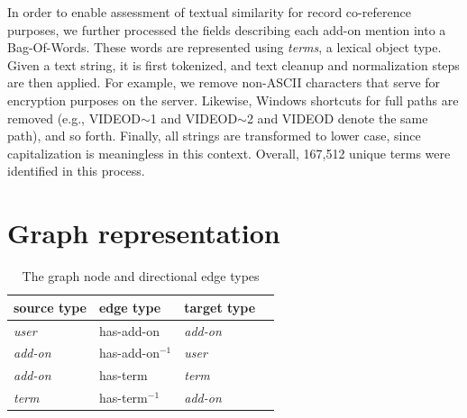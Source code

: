 \documentclass[11pt,oneside]{book}
\let\Oldsection\section
\renewcommand{\section}{\FloatBarrier\Oldsection}
\begin{document}
In order to enable assessment of textual similarity for record co-reference purposes, we further processed the fields describing each add-on mention into a Bag-Of-Words. These words are represented using {\it terms}, a lexical object type. Given a text string, it is first tokenized, and text cleanup and normalization steps are then applied. For example, we remove non-ASCII characters that serve for encryption purposes on the server. Likewise,  Windows shortcuts for full paths are removed (e.g., VIDEOD$\sim$1 and VIDEOD$\sim$2 and VIDEOD denote the same path), and so forth. Finally, all strings are transformed to lower case, since capitalization is meaningless in this context. Overall, 167,512 unique terms were identified in this process.


\section{Graph representation}
\label{sec:graph_representation}
\begin{table}[t]
\begin{center}
\begin{small}
\begin{tabular}{llll}
\hline 
\textbf{source type} & \textbf{edge type} & \textbf{target type} \\
\hline
{\it user} & has-add-on & {\it add-on} \\
\hline
{\it add-on} &  has-add-on$^{-1}$ & {\it user} \\
{\it add-on} & has-term & {\it term} \\
\hline
{\it term} & has-term$^{-1}$ & {\it add-on} \\
\hline
\end{tabular}
\end{small}
\end{center}
\caption{\label{tab:graph_structure} The graph node and directional edge types}
\end{table}
\end{document}
